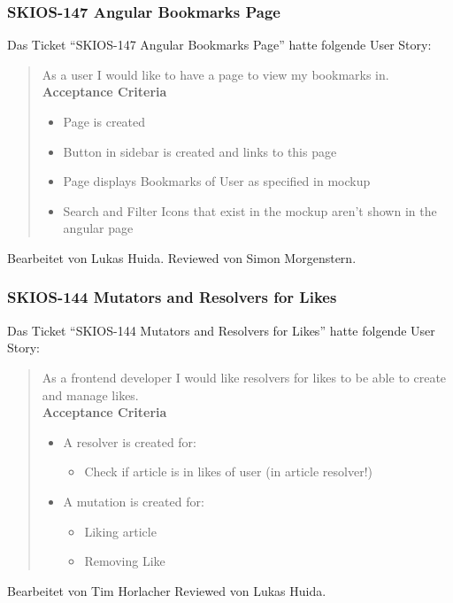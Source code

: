\subsubsection{SKIOS-147 Angular Bookmarks Page}
Das Ticket \enquote{SKIOS-147 Angular Bookmarks Page} hatte folgende User Story:
\begin{quotation}
    As a user I would like to have a page to view my bookmarks in. \\
\textbf{Acceptance Criteria}
\begin{itemize}
    \item Page is created
    \item Button in sidebar is created and links to this page
    \item Page displays Bookmarks of User as specified in mockup
    \item Search and Filter Icons that exist in the mockup aren't shown in the angular page
\end{itemize}
\end{quotation}
Bearbeitet von Lukas Huida.
Reviewed von Simon Morgenstern.

\subsubsection{SKIOS-144 Mutators and Resolvers for Likes}
Das Ticket \enquote{SKIOS-144 Mutators and Resolvers for Likes} hatte folgende User Story:
\begin{quotation}
    As a frontend developer I would like resolvers for likes to be able to create and manage likes. \\
\textbf{Acceptance Criteria}
\begin{itemize}
    \item A resolver is created for:
    \begin{itemize}
        \item Check if article is in likes of user (in article resolver!)
    \end{itemize}
    \item A mutation is created for:
    \begin{itemize}
        \item Liking article
        \item Removing Like
    \end{itemize}
\end{itemize}
\end{quotation}
Bearbeitet von Tim Horlacher
Reviewed von Lukas Huida.

